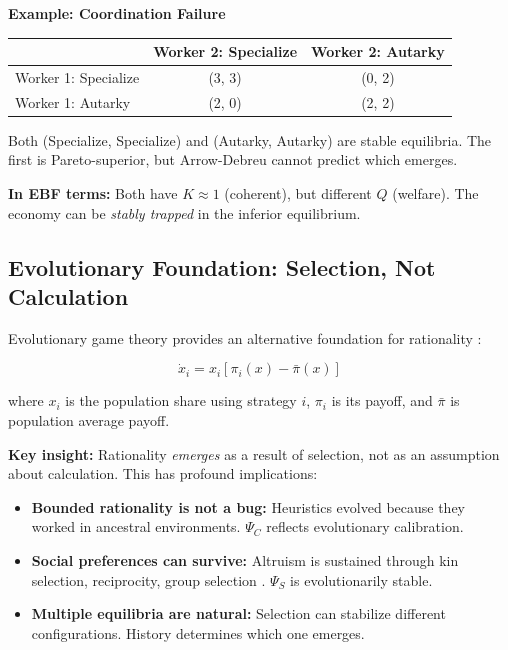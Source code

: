 \textbf{Example: Coordination Failure}
\begin{center}
\renewcommand{\arraystretch}{1.2}
\begin{tabular}{l|cc}
 & Worker 2: Specialize & Worker 2: Autarky \\
\hline
Worker 1: Specialize & (3, 3) & (0, 2) \\
Worker 1: Autarky & (2, 0) & (2, 2) \\
\end{tabular}
\end{center}

Both (Specialize, Specialize) and (Autarky, Autarky) are stable equilibria.
The first is Pareto-superior, but Arrow-Debreu cannot predict which emerges.

\textbf{In EBF terms:} Both have $K \approx 1$ (coherent), but different $Q$ (welfare).
The economy can be \textit{stably trapped} in the inferior equilibrium.

\subsection{Evolutionary Foundation: Selection, Not Calculation}

Evolutionary game theory provides an alternative foundation for rationality
\citep{weibull1995, maynardsmith1982}:

\begin{equation}
\boxed{
\dot{x}_i = x_i \left[ \pi_i(x) - \bar{\pi}(x) \right]
}
\label{eq:mp-replicator}
\end{equation}

where $x_i$ is the population share using strategy $i$, $\pi_i$ is its payoff,
and $\bar{\pi}$ is population average payoff.

\textbf{Key insight:} Rationality \textit{emerges} as a result of selection, not as
an assumption about calculation. This has profound implications:

\begin{itemize}
\item \textbf{Bounded rationality is not a bug:} Heuristics evolved because they worked
      in ancestral environments. $\Psi_C$ reflects evolutionary calibration.
\item \textbf{Social preferences can survive:} Altruism is sustained through kin selection,
      reciprocity, group selection \citep{fehr2004nature}. $\Psi_S$ is evolutionarily stable.
\item \textbf{Multiple equilibria are natural:} Selection can stabilize different configurations.
      History determines which one emerges.
\end{itemize}

